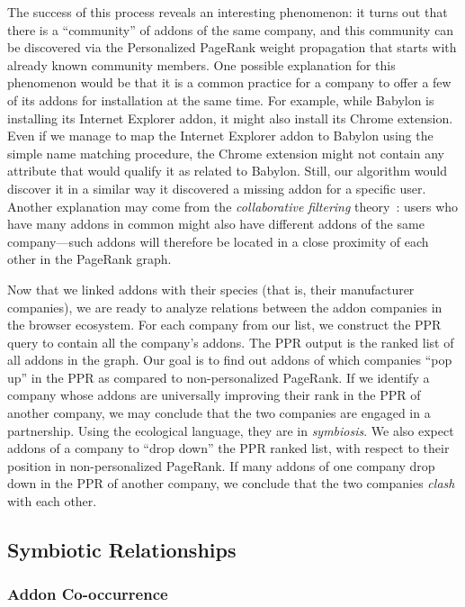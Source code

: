 \documentclass[ijoc,nonblindrev]{informs3} %
\numberwithin{equation}{subsection}
\begin{document}
The success of this process reveals an interesting phenomenon: it turns out that there is a ``community'' of addons of the same company, and this community can be discovered via the Personalized PageRank weight propagation that starts with already known community members. One possible explanation for this phenomenon would be that it is a common practice for a company to offer a few of its addons for installation at the same time. For example, while Babylon is installing its Internet Explorer addon, it might also install its Chrome extension. Even if we manage to map the Internet Explorer addon to Babylon using the simple name matching procedure, the Chrome extension might not contain any attribute that would qualify it as related to Babylon. Still, our algorithm would discover it in a similar way it discovered a missing addon for a specific user. 
Another explanation may come from the \emph{collaborative filtering} theory~\citep{sarwar2001item}: users who have many addons in common might also have different addons of the same company---such addons will therefore be located in a close proximity of each other in the PageRank graph.

Now that we linked addons with their species (that is, their manufacturer companies), we are ready to analyze relations between the addon companies in the browser ecosystem. 
For each company from our list, we construct the PPR query to contain all the company's addons. The PPR output is the ranked list of all addons in the graph. Our goal is to find out addons of which companies ``pop up'' in the PPR as compared to non-personalized PageRank. If we identify a company whose addons are universally improving their rank in the PPR of another company, we may conclude that the two companies are engaged in a partnership. Using the ecological language, they are in \emph{symbiosis}. We also expect addons of a company to ``drop down'' the PPR ranked list, with respect to their position in non-personalized PageRank. If many addons of one company drop down in the PPR of another company, we conclude that the two companies \emph{clash} with each other.

\subsection{Symbiotic Relationships}
\label{sec:symb_relations}

\subsubsection{Addon Co-occurrence}
\label{subsub:co_occurrence}
\end{document}
